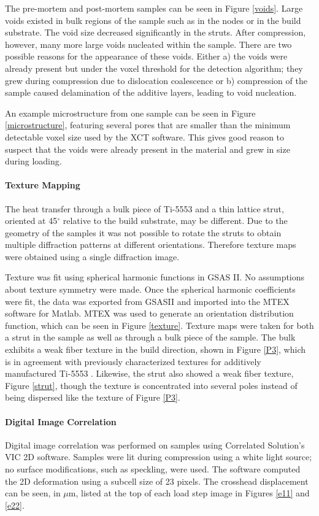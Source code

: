 The pre-mortem and post-mortem samples can be seen in Figure \ref{voids}. Large voids existed in bulk regions of the sample such as in the nodes or in the build substrate. The void size decreased significantly in the struts. After compression, however, many more large voids nucleated within the sample. There are two possible reasons for the appearance of these voids. Either a) the voids were already present but under the voxel threshold for the detection algorithm; they grew during compression due to dislocation coalescence or b) compression of the sample caused delamination of the additive layers, leading to void nucleation.

An example microstructure from one sample can be seen in Figure \ref{microstructure}, featuring several pores that are smaller than the minimum detectable voxel size used by the XCT software. This gives good reason to suspect that the voids were already present in the material and grew in size during loading.


\paragraph{Texture Mapping}
The heat transfer through a bulk piece of Ti-5553 and a thin lattice strut, oriented at 45$^\circ$ relative to the build substrate, may be different. Due to the geometry of the samples it was not possible to rotate the struts to obtain multiple diffraction patterns at different orientations. Therefore texture maps were obtained using a single diffraction image. 

Texture was fit using spherical harmonic functions in GSAS II. No assumptions about texture symmetry were made. Once the spherical harmonic coefficients were fit, the data was exported from GSASII and imported into the MTEX software for Matlab. MTEX was used to generate an orientation distribution function, which can be seen in Figure \ref{texture}. Texture maps were taken for both a strut in the sample as well as through a bulk piece of the sample. The bulk exhibits a weak fiber texture in the build direction, shown in Figure \ref{P3}, which is in agreement with previously characterized textures for additively manufactured Ti-5553 \cite{Schwab2016}. Likewise, the strut also showed a weak fiber texture, Figure \ref{strut}, though the texture is concentrated into several poles instead of being dispersed like the texture of Figure \ref{P3}.


\paragraph{Digital Image Correlation}
Digital image correlation was performed on samples using Correlated Solution's VIC 2D software. Samples were lit during compression using a white light source; no surface modifications, such as speckling, were used. The software computed the 2D deformation using a subcell size of 23 pixels. The crosshead displacement can be seen, in $\mu$m, listed at the top of each load step image in Figures \ref{e11} and \ref{e22}.


